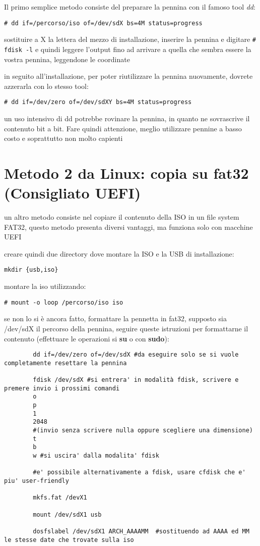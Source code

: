 \documentclass[twoside,italian]{book}
\newcommand{\code}[1]{\texttt{#1}}
\newcommand{\centcode}[1]{

\definecolor{codice}{rgb}{0.5,0.1,0.1}

	\begin{center}
		\color{codice}
		\code{#1}
	\end{center}


}
\begin{document}
			Il primo semplice metodo consiste del preparare la pennina con il famoso tool \textit{dd}:

			\centcode{\# dd if=/percorso/iso of=/dev/sdX bs=4M status=progress}

			sostituire a X la lettera del mezzo di installazione, inserire la pennina e digitare \code{\# fdisk -l} e quindi leggere l'output fino ad arrivare a quella che sembra essere la vostra pennina, leggendone le coordinate

			in seguito all'installazione, per poter riutilizzare la pennina nuovamente, dovrete azzerarla con lo stesso tool:
			\centcode{\# dd if=/dev/zero of=/dev/sdXY bs=4M status=progress}

			\begin{tcolorbox}[floatplacement=b,width=\textwidth,colback={blue},title={NOTA BENE:},colbacktitle=gray,coltitle=white,colupper=white]
				un uso intensivo di dd potrebbe rovinare la pennina, in quanto ne sovrascrive il contenuto bit a bit. Fare quindi attenzione, meglio utilizzare pennine a basso costo e soprattutto non molto capienti
			\end{tcolorbox}

		\section{Metodo 2  da Linux:  copia su fat32 (Consigliato UEFI)}
			un altro metodo consiste nel copiare il contenuto della ISO in un file system FAT32, questo metodo presenta diversi vantaggi, ma funziona solo con macchine UEFI

			creare quindi due directory dove montare la ISO e la USB di installazione:
			\centcode{mkdir \{usb,iso\}}

			montare la iso utilizzando: \centcode{\# mount -o loop /percorso/iso iso}

			se non lo si è ancora fatto, formattare la pennetta in fat32, supposto sia /dev/sdX il percorso della pennina, seguire queste istruzioni per formattarne il contenuto (effettuare le operazioni si \textbf{su} o con \textbf{sudo}):\\


\begin{lstlisting}
		dd if=/dev/zero of=/dev/sdX #da eseguire solo se si vuole completamente resettare la pennina

		fdisk /dev/sdX #si entrera' in modalità fdisk, scrivere e premere invio i prossimi comandi
		o
		p
		1
		2048
		#(invio senza scrivere nulla oppure scegliere una dimensione)
		t
		b
		w #si uscira' dalla modalita' fdisk

		#e' possibile alternativamente a fdisk, usare cfdisk che e' piu' user-friendly

		mkfs.fat /devX1

		mount /dev/sdX1 usb

		dosfslabel /dev/sdX1 ARCH_AAAAMM  #sostituendo ad AAAA ed MM le stesse date che trovate sulla iso
\end{lstlisting}
\end{document}
